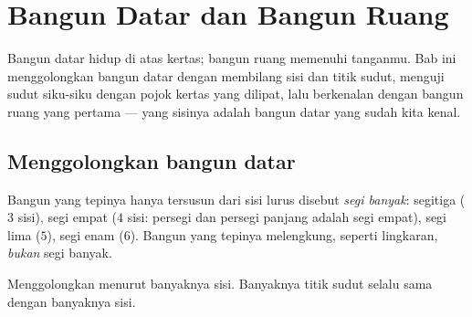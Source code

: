 \chapter{Bangun Datar dan Bangun Ruang}\label{ch:g2:shapes}

Bangun datar hidup di atas kertas; bangun ruang memenuhi tanganmu.
Bab ini menggolongkan bangun datar dengan membilang sisi dan titik
sudut, menguji sudut siku-siku dengan pojok kertas yang dilipat, lalu
berkenalan dengan bangun ruang yang pertama --- yang sisinya adalah
bangun datar yang sudah kita kenal.

\section{Menggolongkan bangun datar}

\begin{definition}\label{def:g2:shapes:sort}
Bangun yang tepinya hanya tersusun dari sisi lurus disebut
\emph{segi banyak}: segitiga ($3$ sisi), segi empat ($4$ sisi:
persegi dan persegi panjang adalah segi empat), segi lima ($5$),
segi enam ($6$). Bangun yang tepinya melengkung, seperti lingkaran,
\emph{bukan} segi banyak.
\end{definition}

\begin{omfigure}

{\small Menggolongkan menurut banyaknya sisi. Banyaknya titik sudut
selalu sama dengan banyaknya sisi.}
\end{omfigure}


